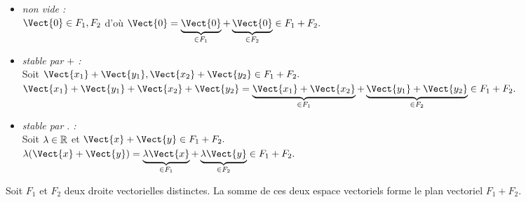 \documentclass{book}
\begin{document}
\begin{Demonstration}
\begin{itemize}
\item \textit{non vide :}\\
$\Vect{0}\in F_1,F_2$ d'où $\Vect{0}=\underbrace{\Vect{0}}_{\in F_1}+\underbrace{\Vect{0}}_{\in F_2}\in F_1+F_2.$
\item \textit{stable par $+$ :}\\
Soit $\Vect{x_1}+\Vect{y_1},\Vect{x_2}+\Vect{y_2} \in  F_1+F_2.$\\
$\Vect{x_1}+\Vect{y_1}+\Vect{x_2}+\Vect{y_2} =\underbrace{\Vect{x_1}+\Vect{x_2}}_{\in F_1}+\underbrace{\Vect{y_1}+\Vect{y_2}}_{\in F_2}\in  F_1+F_2.$
\item
  \textit{stable par $.$ :} \\
Soit $\lambda\in \mathbb{R}$ et $\Vect{x}+\Vect{y}  \in  F_1+F_2.$\\
$\lambda (\Vect{x}+\Vect{y})=\underbrace{\lambda\Vect{x}}_{\in F_1}+\underbrace{\lambda\Vect{y}}_{\in F_2} \in  F_1+F_2.$
\end{itemize}
\end{Demonstration}
\begin{Exemple}
Soit $F_1$ et $F_2$ deux droite vectorielles distinctes. La somme de ces deux espace vectoriels forme le plan vectoriel $F_1+F_2$.
\begin{center}

\end{center}
\end{Exemple}
\end{document}
